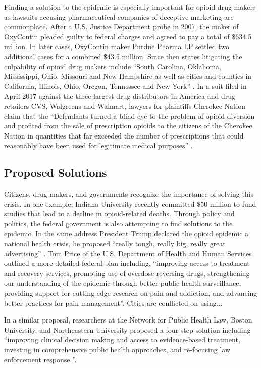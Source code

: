 \documentclass[sigconf]{acmart}
\begin{document}
Finding a solution to the epidemic is especially important for opioid drug makers as lawsuits accusing pharmaceutical companies of deceptive marketing are commonplace. After a U.S. Justice Department probe in 2007, the maker of OxyContin pleaded guilty to federal charges and agreed to pay a total of \$634.5 million. In later cases, OxyContin maker Purdue Pharma LP settled two additional cases for a combined \$43.5 million. Since then states litigating the culpability of opioid drug makers include ``South Carolina, Oklahoma, Mississippi, Ohio, Missouri and New Hampshire as well as cities and counties in California, Illinois, Ohio, Oregon, Tennessee and New York'' \cite{opsis11}. In a suit filed in April 2017 against the three largest drug distributors in America and drug retailers CVS, Walgreens and Walmart, lawyers for plaintiffs Cherokee Nation claim that the ``Defendants turned a blind eye to the problem of opioid diversion and profited from the sale of prescription opioids to the citizens of the Cherokee Nation in quantities that far exceeded the number of prescriptions that could reasonably have been used for legitimate medical purposes'' \cite{opsis5}.

\subsection{Proposed Solutions}
Citizens, drug makers, and governments recognize the importance of solving this crisis. In one example, Indiana University recently committed \$50 million to fund studies that lead to a decline in opioid-related deaths. Through policy and politics, the federal government is also attempting to find solutions to the epidemic. In the same address President Trump declared the opioid epidemic a national health crisis, he proposed ``really tough, really big, really great advertising'' \cite{opsis6}. Tom Price of the U.S. Department of Health and Human Services outlined a more detailed federal plan including, ``improving access to treatment and recovery services, promoting use of overdose-reversing drugs, strengthening our understanding of the epidemic through better public health surveillance, providing support for cutting edge research on pain and addiction, and advancing better practices for pain management''\cite{opsis7}. Cities are conflicted on using...

In a similar proposal, researchers at the Network for Public Health Law, Boston University, and Northeastern University proposed a four-step solution including ``improving clinical decision making and access to evidence-based treatment, investing in comprehensive public health approaches, and re-focusing law enforcement response ''\cite{Davis01}. 
\end{document}
